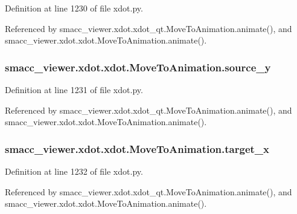 Definition at line 1230 of file xdot.\+py.



Referenced by smacc\+\_\+viewer.\+xdot.\+xdot\+\_\+qt.\+Move\+To\+Animation.\+animate(), and smacc\+\_\+viewer.\+xdot.\+xdot.\+Move\+To\+Animation.\+animate().

\subsubsection[{\texorpdfstring{source\+\_\+y}{source_y}}]{\setlength{\rightskip}{0pt plus 5cm}smacc\+\_\+viewer.\+xdot.\+xdot.\+Move\+To\+Animation.\+source\+\_\+y}\hypertarget{classsmacc__viewer_1_1xdot_1_1xdot_1_1MoveToAnimation_a40825c7f41d700635425cd40fca1f6a4}{}\label{classsmacc__viewer_1_1xdot_1_1xdot_1_1MoveToAnimation_a40825c7f41d700635425cd40fca1f6a4}


Definition at line 1231 of file xdot.\+py.



Referenced by smacc\+\_\+viewer.\+xdot.\+xdot\+\_\+qt.\+Move\+To\+Animation.\+animate(), and smacc\+\_\+viewer.\+xdot.\+xdot.\+Move\+To\+Animation.\+animate().

\subsubsection[{\texorpdfstring{target\+\_\+x}{target_x}}]{\setlength{\rightskip}{0pt plus 5cm}smacc\+\_\+viewer.\+xdot.\+xdot.\+Move\+To\+Animation.\+target\+\_\+x}\hypertarget{classsmacc__viewer_1_1xdot_1_1xdot_1_1MoveToAnimation_a5ea1e33ebe1d6ab9bfa86a336b3a2524}{}\label{classsmacc__viewer_1_1xdot_1_1xdot_1_1MoveToAnimation_a5ea1e33ebe1d6ab9bfa86a336b3a2524}


Definition at line 1232 of file xdot.\+py.



Referenced by smacc\+\_\+viewer.\+xdot.\+xdot\+\_\+qt.\+Move\+To\+Animation.\+animate(), and smacc\+\_\+viewer.\+xdot.\+xdot.\+Move\+To\+Animation.\+animate().

